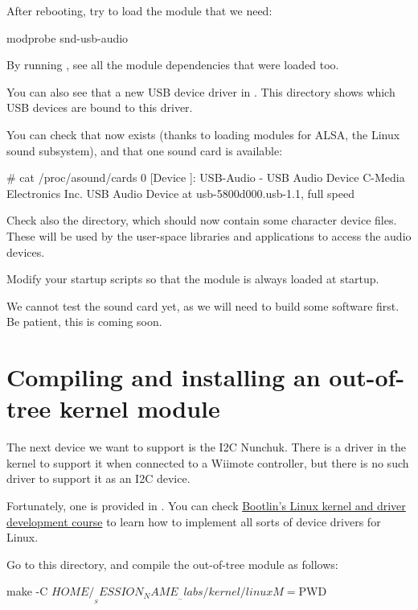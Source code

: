 After rebooting, try to load the module that we need:

\begin{bashinput}
modprobe snd-usb-audio
\end{bashinput}

By running , see all the module dependencies that
were loaded too.

You can also see that a new USB device driver in
. This directory shows which
USB devices are bound to this driver.

You can check that  now exists (thanks to loading
modules for ALSA, the Linux sound subsystem), and that one sound
card is available:

\begin{bashinput}
# cat /proc/asound/cards
 0 [Device         ]: USB-Audio - USB Audio Device
                      C-Media Electronics Inc. USB Audio Device at usb-5800d000.usb-1.1, full speed
\end{bashinput}

Check also the  directory, which should now contain
some character device files. These will be used by the user-space
libraries and applications to access the audio devices.

Modify your startup scripts so that the  module
is always loaded at startup.

We cannot test the sound card yet, as we will need to build some
software first. Be patient, this is coming soon.

\section{Compiling and installing an out-of-tree kernel module}

The next device we want to support is the I2C Nunchuk. There is a driver
in the kernel to support it when connected to a Wiimote controller, but
there is no such driver to support it as an I2C device.

Fortunately, one is provided in
. You can check
\href{https://bootlin.com/training/kernel/}{Bootlin's Linux kernel and
driver development course} to learn how to implement all sorts of device
drivers for Linux.

Go to this directory, and compile the out-of-tree module as follows:

\begin{bashinput}
make -C $HOME/__SESSION_NAME__-labs/kernel/linux M=$PWD
\end{bashinput}

